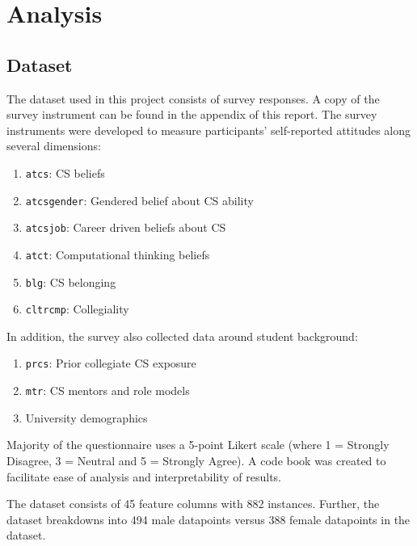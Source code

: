 
\chapter*{Analysis}

\section* {Dataset}
The dataset used in this project consists of survey responses. A copy of the survey instrument can be found in the appendix of this report. The survey instruments were developed to measure participants' self-reported attitudes along several dimensions: 

\begin{enumerate}%
\item \texttt{atcs}: CS beliefs
\item \texttt{atcsgender}: Gendered belief about CS ability
\item \texttt{atcsjob}: Career driven beliefs about CS
\item \texttt{atct}: Computational thinking beliefs
\item \texttt{blg}: CS belonging
\item \texttt{cltrcmp}: Collegiality
\end{enumerate}

In addition, the survey also collected data around student background: 

\begin{enumerate}%
\item \texttt{prcs}: Prior collegiate CS exposure
\item \texttt{mtr}: CS mentors and role models
\item University demographics
\end{enumerate}



Majority of the questionnaire uses a 5-point Likert scale (where 1 = Strongly Disagree, 3 = Neutral and 5 = Strongly Agree). A code book was created to facilitate ease of analysis and interpretability of results. 

The dataset consists of 45 feature columns with 882 instances. Further, the dataset breakdowns into 494 male datapoints versus 388 female datapoints in the dataset. 


